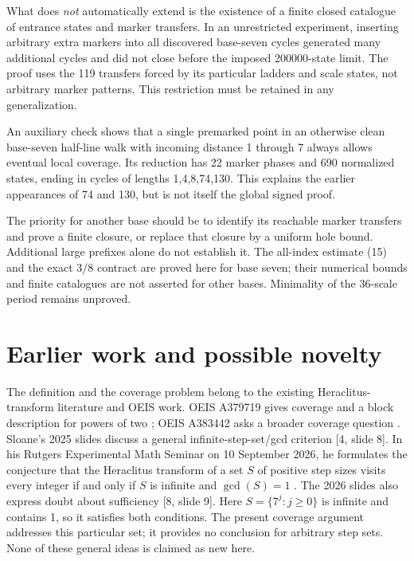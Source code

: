 \documentclass[11pt,a4paper]{article}
\begin{document}
What does \emph{not} automatically extend is the existence of a finite closed catalogue of entrance states and marker transfers. In an unrestricted experiment, inserting arbitrary extra markers into all discovered base-seven cycles generated many additional cycles and did not close before the imposed 200000-state limit. The proof uses the 119 transfers forced by its particular ladders and scale states, not arbitrary marker patterns. This restriction must be retained in any generalization.

An auxiliary check shows that a single premarked point in an otherwise clean base-seven half-line walk with incoming distance 1 through 7 always allows eventual local coverage. Its reduction has 22 marker phases and 690 normalized states, ending in cycles of lengths 1,4,8,74,130. This explains the earlier appearances of 74 and 130, but is not itself the global signed proof.

The priority for another base should be to identify its reachable marker
transfers and prove a finite closure, or replace that closure by a uniform
hole bound. Additional large prefixes alone do not establish it. The
all-index estimate (15) and the exact $3/8$ contract are proved here for
base seven; their numerical bounds and finite catalogues are not asserted
for other bases. Minimality of the 36-scale period remains unproved.

\section{Earlier work and possible novelty}
\label{sec:12}

The definition and the coverage problem belong to the existing Heraclitus-transform literature and OEIS work. OEIS A379719 gives coverage and a block description for powers of two \cite{ref1}; OEIS A383442 asks a broader coverage question \cite{ref2}. Sloane's 2025 slides discuss a general infinite-step-set/gcd criterion [4, slide 8]. In his Rutgers Experimental Math Seminar on 10 September 2026, he formulates the conjecture that the Heraclitus transform of a set $S$ of positive step sizes visits every integer if and only if $S$ is infinite and $\gcd(S)=1$ \cite{talk2026}. The 2026 slides also express doubt about sufficiency [8, slide 9]. Here $S=\{7^j:j\ge0\}$ is infinite and contains 1, so it satisfies both conditions. The present coverage argument addresses this particular set; it provides no conclusion for arbitrary step sets. None of these general ideas is claimed as new here.
\end{document}

